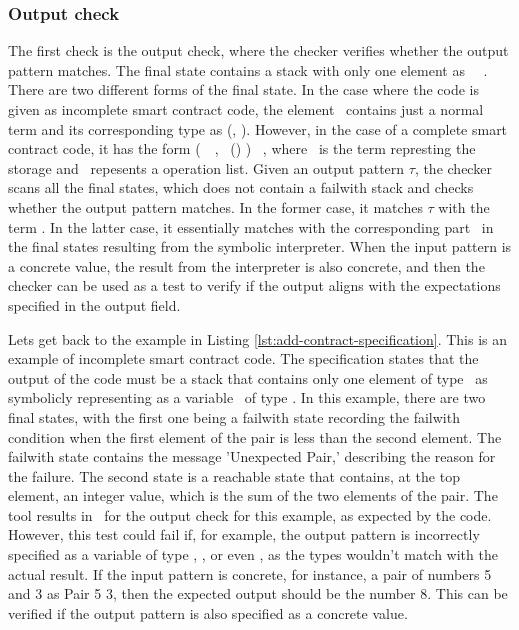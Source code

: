 \documentclass[a4paper,UKenglish,cleveref, autoref, thm-restate]{lipics-v2021}
\begin{document}
\subsubsection{Output check} 
The first check is the output check, where the checker verifies whether the output pattern matches. The final state contains a stack with only one element as \Stack\ \STACKCONCAT\ \EMPTYSTACK. There are two different forms of the final state. In the case where the code is given as incomplete smart contract code, the element \Stack\ contains just a normal term and its corresponding type as (\Term, \TY). However, in the case of a complete smart contract code, it has the form (\PAIR\ \VOPERATIONLIST\ \VSTORAGE, \TPAIR\ (\TOPERATIONLIST) \TYS) \STACKCONCAT\ \EMPTYSTACK, where \VSTORAGE\ is the term represting the storage and \VOPERATIONLIST\ repesents a operation list. Given an output pattern $ \tau$, the checker scans all the final states, which does not contain a failwith stack and checks whether the output pattern matches. In the former case, it matches $ \tau$  with the term \Term. In the latter case, it essentially matches with the corresponding part \VSTORAGE\ in the final states resulting from the symbolic interpreter. When the input pattern is a concrete value, the result from the interpreter is also concrete, and then the checker can be used as a test to verify if the output aligns with the expectations specified in the output field.

Lets get back to the example in Listing \ref{lst:add-contract-specification}. This is an example of incomplete smart contract code. The specification states that the output of the code must be a stack that contains only one element of type \TINT\ as symbolicly representing as a variable \VZ\ of type \TINT.  In this example, there are two final states, with the first one being a failwith state recording the failwith condition when the first element of the pair is less than the second element. The failwith state contains the message 'Unexpected Pair,' describing the reason for the failure. The second state is a reachable state that contains, at the top element, an integer value, which is the sum of the two elements of the pair. The tool results in \TRUE\ for the output check for this example, as expected by the code. However, this test could fail if, for example, the output pattern is incorrectly specified as a variable of type \TSTRING, \TMUTEZ, or even \TNAT, as the types wouldn't match with the actual result. If the input pattern is concrete, for instance, a pair of numbers 5 and 3 as Pair 5 3, then the expected output should be the number 8. This can be verified if the output pattern is also specified as a concrete value.
\end{document}
